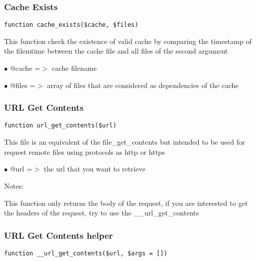 \documentclass[a4paper]{article}
\begin{document}
\subsubsection{Cache Exists}

\begin{lstlisting}
function cache_exists($cache, $files)
\end{lstlisting}

This function check the existence of valid cache by comparing the timestamp
of the filemtime between the cache file and all files of the second argument

\begin{compactitem}
\item[\color{myblue}$\bullet$] @cache =$>$ cache filename
\item[\color{myblue}$\bullet$] @files =$>$ array of files that are considered as dependencies of the cache
\end{compactitem}

\hypertarget{toc133}{}
\subsubsection{URL Get Contents}

\begin{lstlisting}
function url_get_contents($url)
\end{lstlisting}

This file is an equivalent of the file\_get\_contents but intended to be used
for request remote files using protocols as http or https

\begin{compactitem}
\item[\color{myblue}$\bullet$] @url =$>$ the url that you want to retrieve
\end{compactitem}

Notes:

This function only returns the body of the request, if you are interested
to get the headers of the request, try to use the \_\_url\_get\_contents

\hypertarget{toc134}{}
\subsubsection{URL Get Contents helper}

\begin{lstlisting}
function __url_get_contents($url, $args = [])
\end{lstlisting}
\end{document}
